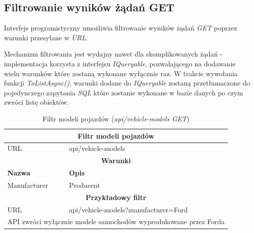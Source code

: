 \documentclass[eng,printmode,openany]{mgr}
\begin{document}
\subsection{Filtrowanie wyników żądań GET}
Interfejs programistyczny umożliwia filtrowanie wyników żądań \textit{GET} poprzez warunki przesyłane w \textit{URL}.

Mechanizm filtrowania jest wydajny nawet dla skomplikowanych żądań - implementacja korzysta z interfejsu \textit{IQueryable}, pozwalającego na dodawanie wielu warunków które zostaną wykonane wyłącznie raz. W trakcie wywołania funkcji \textit{ToListAsync()}, warunki dodane do \textit{IQueryable} zostaną przetłumaczone do pojedynczego zapytania \textit{SQL} które zostanie wykonane w bazie danych po czym zwróci listę obiektów.
	


\begin{table}[H]
	\caption{Filtr modeli pojazdów (\textit{api/vehicle-models GET})}
	\begin{tabularx}{\textwidth}{|l|X|}
		\hline                                       							
		\multicolumn{2}{|c|}{\textbf{Filtr modeli pojazdów}}  							        \\ \hline
		URL                 & api/vehicle-models     							             	\\ \hline
		\multicolumn{2}{|c|}{\textbf{Warunki}}     												\\ \hline
		\textbf{Nazwa}      & \textbf{Opis}              										\\ \hline
		Manufacturer        & Producent         												\\ \hline
		\multicolumn{2}{|c|}{\textbf{Przykładowy filtr}}										\\ \hline
		URL                 & api/vehicle-models?manufacturer=Ford								\\ \hline
		\multicolumn{2}{|l|}{API zwróci wyłącznie modele samochodów wyprodukowane przez Forda}	\\ \hline
	\end{tabularx}
\end{table}
\end{document}
